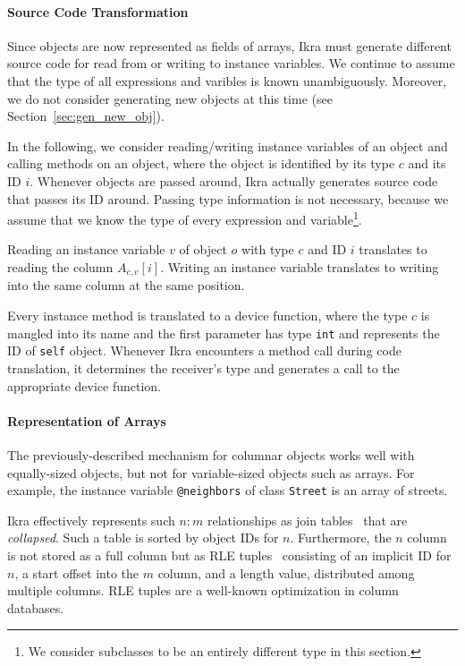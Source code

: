 \documentclass[preprint]{sigplanconf}
\begin{document}
\paragraph{Source Code Transformation}
Since objects are now represented as fields of arrays, Ikra must generate different source code for read from or writing to instance variables. We continue to assume that the type of all expressions and varibles is known unambiguously. Moreover, we do not consider generating new objects at this time (see Section~\ref{sec:gen_new_obj}).

In the following, we consider reading/writing instance variables of an object and calling methods on an object, where the object is identified by its type $c$ and its ID $i$. Whenever objects are passed around, Ikra actually generates source code that passes its ID around. Passing type information is not necessary, because we assume that we know the type of every expression and variable\footnote{We consider subclasses to be an entirely different type in this section.}.

Reading an instance variable $v$ of object $o$ with type $c$ and ID $i$ translates to reading the column $A_{c,v}[i]$. Writing an instance variable translates to writing into the same column at the same position.

Every instance method is translated to a device function, where the type $c$ is mangled into its name and the first parameter has type \texttt{int} and represents the ID of \texttt{self} object. Whenever Ikra encounters a method call during code translation, it determines the receiver's type and generates a call to the appropriate device function.

\paragraph{Representation of Arrays}
The previously-described mechanism for columnar objects works well with equally-sized objects, but not for variable-sized objects such as arrays. For example, the instance variable \texttt{@neighbors} of class \texttt{Street} is an array of streets.

Ikra effectively represents such $n:m$ relationships as join tables~\cite{Garcia-Molina:2008:DSC:1450931} that are \emph{collapsed}. Such a table is sorted by object IDs for $n$. Furthermore, the $n$ column is not stored as a full column but as RLE tuples~\cite{Abadi:2006:ICE:1142473.1142548} consisting of an implicit ID for $n$, a start offset into the $m$ column, and a length value, distributed among multiple columns. RLE tuples are a well-known optimization in column databases.
\end{document}
